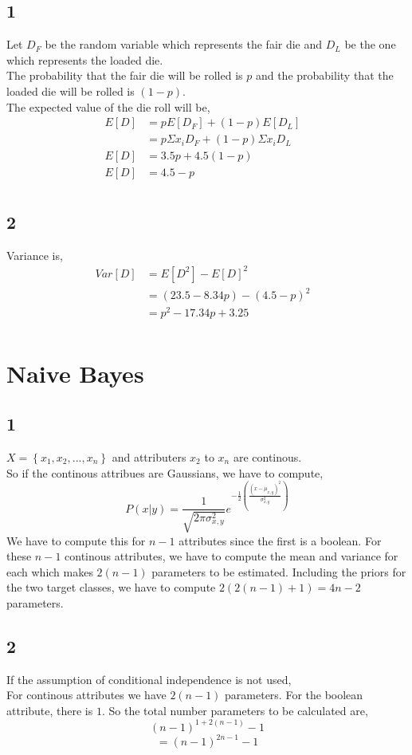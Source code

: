 \documentclass[10pt,a4paper]{article}
\begin{document}
\subsection*{1}
Let $D_{F}$ be the random variable which represents the fair die and $D_{L}$ be the one which represents the loaded die. \\
The probability that the fair die will be rolled is $p$ and the probability that the loaded die will be rolled is $(1-p)$. \\
The expected value of the die roll will be,
\begin{align*}
E\left[D\right] &= pE\left[ D_{F} \right] + (1-p)E\left[ D_{L}\right]& \\
&=p\Sigma x_{i}D_{F}+(1-p)\Sigma x_{i}D_{L}& \\
E\left[D\right]&=3.5p+4.5(1-p)& \\
E\left[D\right]&=4.5-p& \\
\end{align*}
\subsection*{2}
Variance is,
\begin{align*}
Var[D]&=E[D^{2}]-E[D]^{2}& \\
&=(23.5-8.34p)-(4.5 - p)^{2}& \\
&=p^{2}-17.34p+3.25& \\
\end{align*}
\section{Naive Bayes}
\subsection*{1}
$X= \left\{ x_{1},x_{2},...,x_{n} \right\} $ and attributers $x_{2}$ to $x_{n}$ are continous.\\
So if the continous attribues are Gaussians, we have to compute,
$$P \left(x|y\right)=\frac{1}{\sqrt{2 \pi \sigma_{x,y}^{2}}}e^{-\frac{1}{2} \left( \frac{\left(x-\mu_{x,y} \right)^{2}}{\sigma_{x,y}^{2}}\right)}$$
We have to compute this for $n-1$ attributes since the first is a boolean. For these $n-1$ continous attributes, we have to compute the mean and variance for each which makes $2\left(n-1 \right)$ parameters to be estimated. Including the priors for the two target classes, we have to compute $2(2(n-1) + 1) = 4n-2$ parameters.
\subsection*{2}
If the assumption of conditional independence is not used,\\
For continous attributes we have $2(n-1)$ parameters.
For the boolean attribute, there is $1$.
So the total number parameters to be calculated are,
$$(n-1)^{1+2(n-1)}-1$$
$$=(n-1)^{2n-1}-1$$
\end{document}
